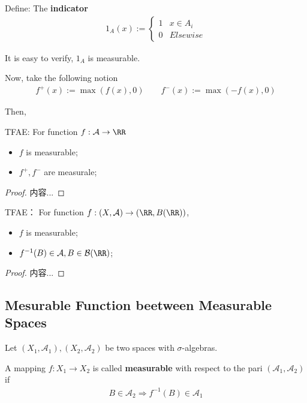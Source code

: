 \documentclass[Total.tex]{subfiles}
\begin{document}
			\begin{Def}
				Define: The \textbf{indicator}
				\begin{gather*}
					1_A(x):=\begin{cases}
						1&x\in A_i\\
						0&Elsewise
					\end{cases}
				\end{gather*}
				
				It is easy to verify, $1_A$ is measurable. 
			\end{Def}
			
			Now, take the following notion
			\begin{gather*}
				f^+(x):=\max(f(x),0)\qquad f^-(x):=\max(-f(x),0)
			\end{gather*}
			
			Then,
			\begin{proposition}
				TFAE: For function $f:\mathcal{A}\rightarrow \RR$
				\begin{itemize}
					\item $f$ is measurable;
					\item $f^+,f^-$ are measurale;
				\end{itemize}
			\end{proposition}
			\begin{proof}
				内容...
			\end{proof}
			\begin{proposition}
				TFAE： For function $f:(X,\mathcal{A})\rightarrow (\RR,B(\RR))$,
				\begin{itemize}
					\item $f$ is measurable;
					\item $f^{-1}(B)\in \mathcal{A},B\in \mathcal{B}(\RR)$;
				\end{itemize}
			\end{proposition}
			\begin{proof}
				内容...
			\end{proof}
			\subsection{Mesurable Function beetween Measurable Spaces}
			
			\begin{Def}
				Let $(X_1,\mathcal{A}_1),(X_2,\mathcal{A}_2)$ be two spaces with $\sigma$-algebras. 
				
				A mapping $f:X_1\rightarrow X_2$ is called \textbf{measurable} with respect to the pari $(\mathcal{A}_1,\mathcal{A}_2)$ if
				\begin{gather*}
					B\in \mathcal{A}_2\Rightarrow f^{-1}(B)\in \mathcal{A}_1
				\end{gather*}
			\end{Def}
			
\end{document}
